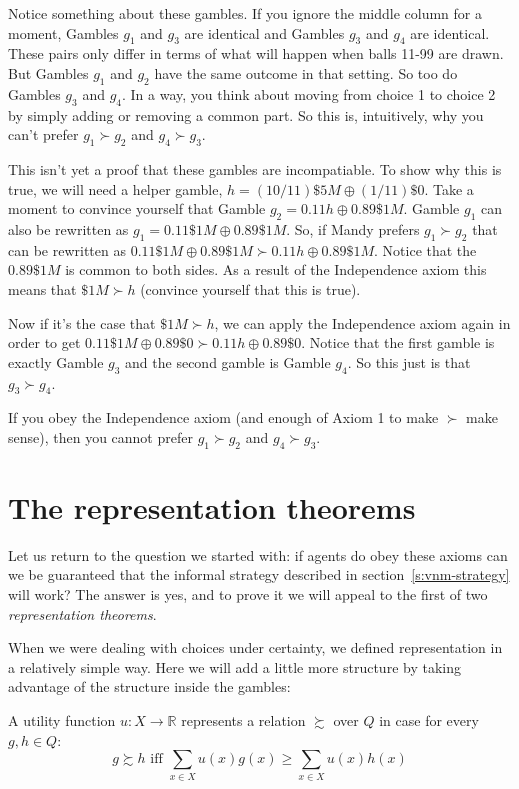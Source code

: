 Notice something about these gambles.  If you ignore the middle column for a moment, Gambles $g_1$ and $g_3$ are identical and Gambles $g_3$ and $g_4$ are identical.  These pairs only differ in terms of what will happen when balls 11-99 are drawn.  But Gambles $g_1$ and $g_2$ have the same outcome in that setting.  So too do Gambles $g_3$ and $g_4$.  In a way, you think about moving from choice 1 to choice 2 by simply adding or removing a common part.  So this is, intuitively, why you can't prefer $g_1 \succ g_2$ and $g_4 \succ g_3$.  

This isn't yet a proof that these gambles are incompatiable.  To show why this is true, we will need a helper gamble, $h = (10/11) \$5M \oplus  (1/11) \$0$.  Take a moment to convince yourself that Gamble $g_2 = 0.11 h \oplus 0.89 \$1M$.  Gamble $g_1$ can also be rewritten as $g_1 = 0.11 \$1M \oplus 0.89 \$1M$.  So, if Mandy prefers $g_1 \succ g_2$ that can be rewritten as $0.11 \$1M \oplus 0.89 \$1M \succ 0.11 h \oplus 0.89 \$1M$.  Notice that the $0.89 \$1M$ is common to both sides.  As a result of the Independence axiom this means that $\$1M \succ h$ (convince yourself that this is true).

Now if it's the case that $\$1M \succ h$, we can apply the Independence axiom again in order to get $0.11 \$1M \oplus 0.89 \$0 \succ 0.11 h \oplus 0.89 \$0$.  Notice that the first gamble is exactly Gamble $g_3$ and the second gamble is Gamble $g_4$. So this just is that $g_3 \succ g_4$.  

If you obey the Independence axiom (and enough of Axiom 1 to make $\succ$ make sense), then you cannot prefer $g_1 \succ g_2$ and $g_4 \succ g_3$. 

\section{The representation theorems}

Let us return to the question we started with: if agents do obey these axioms can we be guaranteed that the informal strategy described in section~\ref{s:vnm-strategy} will work?  The answer is yes, and to prove it we will appeal to the first of two {\it representation theorems}. 

When we were dealing with choices under certainty, we defined representation in a relatively simple way.  Here we will add a little more structure by taking advantage of the structure inside the gambles:

\begin{definition} 
A utility function $u: X \to \mathbb{R}$ represents a relation $\succsim$ over $Q$ in case for every $g, h \in Q$:
\[g \succsim h \text{ iff } \sum_{x \in X} u(x)g(x) \geq \sum_{x \in X} u(x)h(x)\]
\end{definition}

